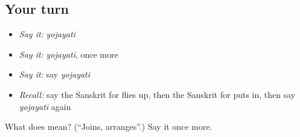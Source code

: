 \subsection*{Your turn}
\begin{itemize}
\raggedright
  \item \emph{Say it:} \emph{yojayati}
  \item \emph{Say it:} \emph{yojayati}, once more
  \item \emph{Say it:} say \emph{yojayati}
  \item \emph{Recall:} say the Sanskrit for flies up, then the Sanskrit for puts in, then say \emph{yojayati} again
\end{itemize}

\begin{tcolorbox}[breakable,colback=teal!4,colframe=teal!35!black,title={Before you move on}]
What does  mean? (\textquotedblleft{}Joins, arranges\textquotedblright{}.) Say it once more.
\end{tcolorbox}
